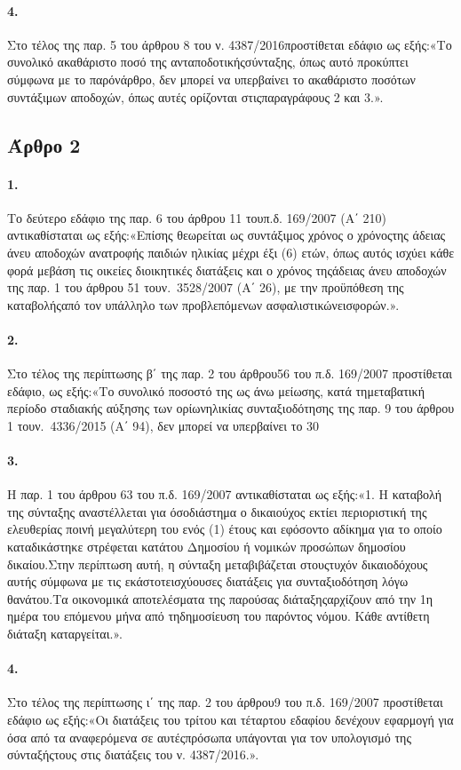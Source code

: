 \documentclass[a4paper,oneside, 10pt]{book}
\begin{document}
\paragraph { 4. } Στο τέλος της παρ. 5 του άρθρου 8 του ν. 4387/2016προστίθεται εδάφιο ως εξής:«Το συνολικό ακαθάριστο ποσό της ανταποδοτικήςσύνταξης, όπως αυτό προκύπτει σύμφωνα με το παρόνάρθρο, δεν μπορεί να υπερβαίνει το ακαθάριστο ποσότων συντάξιμων αποδοχών, όπως αυτές ορίζονται στιςπαραγράφους 2 και 3.».
\subsection*{ Άρθρο 2 }
\paragraph { 1. } Το δεύτερο εδάφιο της παρ. 6 του άρθρου 11 τουπ.δ. 169/2007 (Α΄ 210) αντικαθίσταται ως εξής:«Επίσης θεωρείται ως συντάξιμος χρόνος ο χρόνοςτης άδειας άνευ αποδοχών ανατροφής παιδιών ηλικίας μέχρι έξι (6) ετών, όπως αυτός ισχύει κάθε φορά μεβάση τις οικείες διοικητικές διατάξεις και ο χρόνος τηςάδειας άνευ αποδοχών της παρ. 1 του άρθρου 51 τουν. 3528/2007 (Α΄ 26), με την προϋπόθεση της καταβολήςαπό τον υπάλληλο των προβλεπόμενων ασφαλιστικώνεισφορών.».
\paragraph { 2. } Στο τέλος της περίπτωσης β΄ της παρ. 2 του άρθρου56 του π.δ. 169/2007 προστίθεται εδάφιο, ως εξής:«Το συνολικό ποσοστό της ως άνω μείωσης, κατά τημεταβατική περίοδο σταδιακής αύξησης των ορίωνηλικίας συνταξιοδότησης της παρ. 9 του άρθρου 1 τουν. 4336/2015 (Α΄ 94), δεν μπορεί να υπερβαίνει το 30%
\paragraph { 3. } Η παρ. 1 του άρθρου 63 του π.δ. 169/2007 αντικαθίσταται ως εξής:«1. Η καταβολή της σύνταξης αναστέλλεται για όσοδιάστημα ο δικαιούχος εκτίει περιοριστική της ελευθερίας ποινή μεγαλύτερη του ενός (1) έτους και εφόσοντο αδίκημα για το οποίο καταδικάστηκε στρέφεται κατάτου Δημοσίου ή νομικών προσώπων δημοσίου δικαίου.Στην περίπτωση αυτή, η σύνταξη μεταβιβάζεται στουςτυχόν δικαιοδόχους αυτής σύμφωνα με τις εκάστοτεισχύουσες διατάξεις για συνταξιοδότηση λόγω θανάτου.Τα οικονομικά αποτελέσματα της παρούσας διάταξηςαρχίζουν από την 1η ημέρα του επόμενου μήνα από τηδημοσίευση του παρόντος νόμου. Κάθε αντίθετη διάταξη καταργείται.».
\paragraph { 4. } Στο τέλος της περίπτωσης ι΄ της παρ. 2 του άρθρου9 του π.δ. 169/2007 προστίθεται εδάφιο ως εξής:«Οι διατάξεις του τρίτου και τέταρτου εδαφίου δενέχουν εφαρμογή για όσα από τα αναφερόμενα σε αυτέςπρόσωπα υπάγονται για τον υπολογισμό της σύνταξήςτους στις διατάξεις του ν. 4387/2016.».
\end{document}
